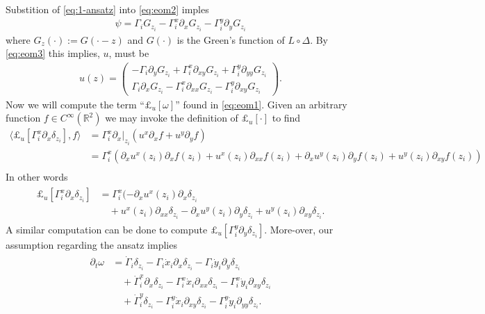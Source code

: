\documentclass[12pt]{amsart}
\begin{document}
Substition of \eqref{eq:1-ansatz} into \eqref{eq:eom2} imples
\begin{align*}
  \psi = \Gamma_i G_{z_i} - \Gamma^x_i \partial_xG_{z_i}
  - \Gamma^y_i \partial_yG_{z_i}
\end{align*}
where $G_{z}(\cdot) := G( \cdot - z)$ and  $G(\cdot)$ is the Green's function of $L \circ \Delta$.
By \eqref{eq:eom3} this implies, $u$, must be
\begin{align}
  u(z) = \begin{pmatrix}
   - \Gamma_i \partial_y G_{z_i} + \Gamma^x_i \partial_{xy}G_{z_i}
   + \Gamma^y_i \partial_{yy}G_{z_i} \\
    \Gamma_i \partial_xG_{z_i} - \Gamma^x_i \partial_{xx}G_{z_i}
  - \Gamma^y_i \partial_{xy}G_{z_i}
  \end{pmatrix}. \label{eq:1-u}
\end{align}
Now we will compute the term ``$\pounds_u[\omega]$'' found in \eqref{eq:eom1}.
Given an arbitrary function $f \in C^\infty(\mathbb{R}^2)$ we may invoke the definition of $\pounds_u[\cdot]$ to find
\begin{align*}
  \langle \pounds_u[ \Gamma^x_i \partial_x \delta_{z_i} ] , f \rangle &= \Gamma^x_i \partial_x|_{z_i} (u^x \partial_x f + u^y \partial_y f) \\
 &= \Gamma_i^x ( \partial_x u^x(z_i) \partial_xf(z_i) + u^x(z_i) \partial_{xx}f(z_i) 
 + \partial_x u^y(z_i) \partial_yf(z_i) + u^y(z_i) \partial_{xy} f(z_i) )\\
\end{align*}
In other words
\begin{align}
\begin{aligned}
  \pounds_u[\Gamma_i^x \partial_x\delta_{z_i}] &=  \Gamma_i^x ( -\partial_xu^x(z_i) \partial_x \delta_{z_i} \\
  &\quad+ u^x(z_i) \partial_{xx} \delta_{z_i}
  - \partial_x u^y(z_i) \partial_y \delta_{z_i}
  + u^y(z_i) \partial_{xy} \delta_{z_i}.
  \end{aligned}\label{eq:1-Lie}
\end{align}
A similar computation can be done to compute $\pounds_u[\Gamma^y_i \partial_y \delta_{z_i}]$.
More-over, our assumption regarding the ansatz implies
\begin{align}
\begin{aligned}
\partial_t \omega &= \dot{\Gamma}_i \delta_{z_i} - \Gamma_i \dot{x}_i \partial_x \delta_{z_i} - \Gamma_i \dot{y}_i \partial_y \delta_{z_i}\\
&\quad+\dot{\Gamma}_i^x \partial_x \delta_{z_i} - \Gamma_i^x \dot{x}_i \partial_{xx} \delta_{z_i} - \Gamma^x_i \dot{y}_i \partial_{xy} \delta_{z_i}\\
&\quad+\dot{\Gamma}^y_i \delta_{z_i} - \Gamma_i^y \dot{x}_i \partial_{xy} \delta_{z_i} - \Gamma^y_i \dot{y}_i \partial_{yy} \delta_{z_i}.
\end{aligned} \label{eq:1-time_derivative}
\end{align}
\end{document}
